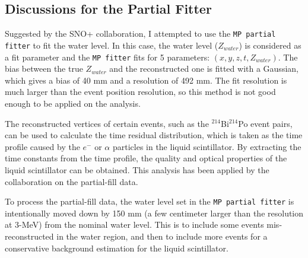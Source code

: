 \subsection{Discussions for the Partial Fitter}\label{sect:partialFitterDiscuss}
Suggested by the SNO+ collaboration, I attempted to use the \texttt{MP partial fitter} to fit the water level\cite{mpFitWaterLevel}. In this case, the water level ($Z_{water}$) is considered as a fit parameter and the \texttt{MP fitter} fits for 5 parameters: $(x,y,z,t,Z_{water})$. The bias between the true $Z_{water}$ and the reconstructed one is fitted with a Gaussian, which gives a bias of 40 mm and a resolution of 492 mm. The fit resolution is much larger than the event position resolution, so this method is not good enough to be applied on the analysis.

The reconstructed vertices of certain events, such as the $^{214}$Bi$^{214}$Po event pairs, can be used to calculate the time residual distribution, which is taken as the time profile caused by the $e^-$ or $\alpha$ particles in the liquid scintillator. By extracting the time constants from the time profile, the quality and optical properties of the liquid scintillator can be obtained. This analysis has been applied by the collaboration on the partial-fill data\cite{partialFillTres,partialFillBiPo214}.

To process the partial-fill data, the water level set in the \texttt{MP partial fitter} is intentionally moved down by 150 mm (a few centimeter larger than the resolution at 3-MeV) from the nominal water level. This is to include some events mis-reconstructed in the water region, and then to include more events for a conservative background estimation for the liquid scintillator. 

